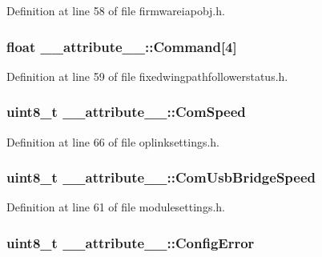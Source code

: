 \-Definition at line 58 of file firmwareiapobj.\-h.

\hypertarget{struct____attribute_____af4aa99defadb1677ea6b23de286d4abb}{
\subsubsection[{\-Command}]{\setlength{\rightskip}{0pt plus 5cm}float {\bf \-\_\-\-\_\-attribute\-\_\-\-\_\-\-::\-Command}\mbox{[}4\mbox{]}}}\label{struct____attribute_____af4aa99defadb1677ea6b23de286d4abb}


\-Definition at line 59 of file fixedwingpathfollowerstatus.\-h.

\hypertarget{struct____attribute_____a1e58bb7c476e12fb4e89cb7015368d93}{
\subsubsection[{\-Com\-Speed}]{\setlength{\rightskip}{0pt plus 5cm}uint8\-\_\-t {\bf \-\_\-\-\_\-attribute\-\_\-\-\_\-\-::\-Com\-Speed}}}\label{struct____attribute_____a1e58bb7c476e12fb4e89cb7015368d93}


\-Definition at line 66 of file oplinksettings.\-h.

\hypertarget{struct____attribute_____aaf60461ebd36601cd402333530161f8f}{
\subsubsection[{\-Com\-Usb\-Bridge\-Speed}]{\setlength{\rightskip}{0pt plus 5cm}uint8\-\_\-t {\bf \-\_\-\-\_\-attribute\-\_\-\-\_\-\-::\-Com\-Usb\-Bridge\-Speed}}}\label{struct____attribute_____aaf60461ebd36601cd402333530161f8f}


\-Definition at line 61 of file modulesettings.\-h.

\hypertarget{struct____attribute_____a8fee755ee2dbe9c6a21bfbcbc4c9e362}{
\subsubsection[{\-Config\-Error}]{\setlength{\rightskip}{0pt plus 5cm}uint8\-\_\-t {\bf \-\_\-\-\_\-attribute\-\_\-\-\_\-\-::\-Config\-Error}}}\label{struct____attribute_____a8fee755ee2dbe9c6a21bfbcbc4c9e362}


